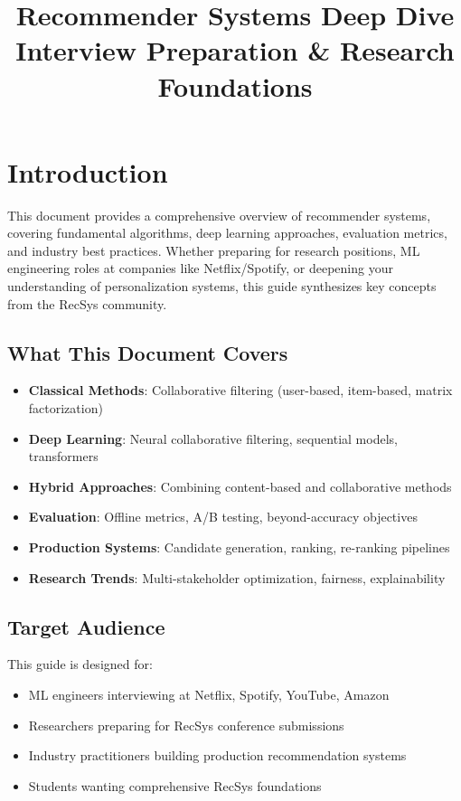 \documentclass[10pt]{article}
\title{\textbf{Recommender Systems Deep Dive} \\
       \large Interview Preparation \& Research Foundations}
\author{}
\date{}
\begin{document}
\maketitle

\tableofcontents
\newpage

\section{Introduction}

This document provides a comprehensive overview of recommender systems, covering fundamental algorithms, deep learning approaches, evaluation metrics, and industry best practices. Whether preparing for research positions, ML engineering roles at companies like Netflix/Spotify, or deepening your understanding of personalization systems, this guide synthesizes key concepts from the RecSys community.

\subsection{What This Document Covers}

\begin{itemize}[leftmargin=*]
    \item \textbf{Classical Methods}: Collaborative filtering (user-based, item-based, matrix factorization)
    \item \textbf{Deep Learning}: Neural collaborative filtering, sequential models, transformers
    \item \textbf{Hybrid Approaches}: Combining content-based and collaborative methods
    \item \textbf{Evaluation}: Offline metrics, A/B testing, beyond-accuracy objectives
    \item \textbf{Production Systems}: Candidate generation, ranking, re-ranking pipelines
    \item \textbf{Research Trends}: Multi-stakeholder optimization, fairness, explainability
\end{itemize}

\subsection{Target Audience}

This guide is designed for:
\begin{itemize}[leftmargin=*]
    \item ML engineers interviewing at Netflix, Spotify, YouTube, Amazon
    \item Researchers preparing for RecSys conference submissions
    \item Industry practitioners building production recommendation systems
    \item Students wanting comprehensive RecSys foundations
\end{itemize}
\end{document}
